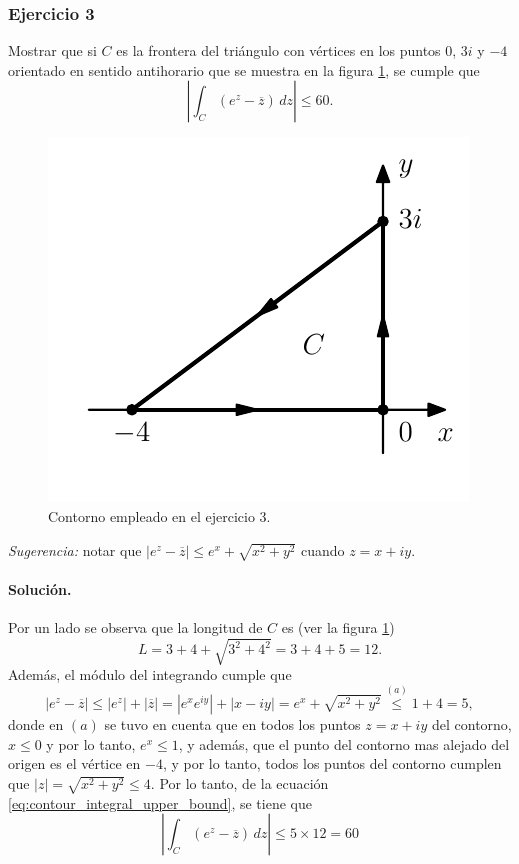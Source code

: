 \documentclass[a4paper]{report}
\begin{document}
\subsubsection{Ejercicio 3}

Mostrar que si \(C\) es la frontera del triángulo con vértices en los puntos \(0\), \(3i\) y \(-4\) orientado en sentido antihorario que se muestra en la figura \ref{fig:exercise_47_03}, se cumple que 
\[
 \left|\int_{C}(e^z-\overline{z})\,dz\right|\leq60.
\]
\begin{figure}[!htb]
 \begin{minipage}[c]{0.35\textwidth}
   \includegraphics[width=\textwidth]{figuras/exercise_47_03.pdf}
 \end{minipage}\hfill
 \begin{minipage}[c]{0.55\textwidth}
  \caption{
       Contorno empleado en el ejercicio 3.
  }\label{fig:exercise_47_03}
 \end{minipage}
\end{figure}

\emph{Sugerencia:} notar que \(|e^z-\overline{z}|\leq e^x+\sqrt{x^2+y^2}\) cuando \(z=x+iy\).

\paragraph{Solución.} Por un lado se observa que la longitud de \(C\) es (ver la figura \ref{fig:exercise_47_03})
\[
 L=3+4+\sqrt{3^2+4^2}=3+4+5=12.
\]
Además, el módulo del integrando cumple que 
\[
 |e^z-\overline{z}|\leq|e^z|+|\overline{z}|=|e^xe^{iy}|+|x-iy|=e^x+\sqrt{x^2+y^2}\overset{(a)}{\leq}1+4=5,
\]
donde en \((a)\) se tuvo en cuenta que en todos los puntos \(z=x+iy\) del contorno, \(x\leq0\) y por lo tanto, \(e^x\leq1\), y además, que el punto del contorno mas alejado del origen es el vértice en \(-4\), y por lo tanto, todos los puntos del contorno cumplen que \(|z|=\sqrt{x^2+y^2}\leq4\). Por lo tanto, de la ecuación \ref{eq:contour_integral_upper_bound}, se tiene que 
\[
 \left|\int_{C}(e^z-\overline{z})\,dz\right|\leq5\times12=60
\]
\end{document}
